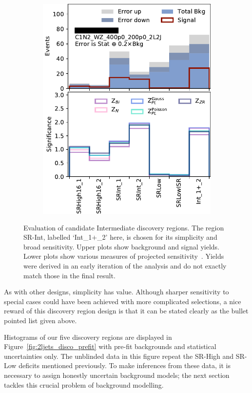 \begin{figure}[tp]
\begin{subfigure}{0.48\textwidth}
\includegraphics[width=\textwidth]{figures/2ljets_disco_Int_C1N2_WZ_400p0_200p0_2L2J.png}
\caption{}
\end{subfigure}
\caption[
Evaluation of candidate Intermediate discovery regions
]{%
Evaluation of candidate Intermediate discovery regions.
The region SR-Int, labelled `Int\_1$+$\_2' here, is chosen for its simplicity
and broad sensitivity.
Upper plots show background and signal yields.
Lower plots show various measures of projected
sensitivity~\cite{cousins2008evaluation}.
Yields were derived in an early iteration of the analysis and do not exactly
match those in the final result.
}
\label{fig:2ljets_disco_trials_int}
\end{figure}

As with other designs, simplicity has value.
Although sharper sensitivity to special cases could have been achieved
with more complicated selections, a nice reward of this discovery region design
is that it can be stated clearly as the bullet pointed list given above.

Histograms of our five discovery regions are displayed in
Figure~\ref{fig:2ljets_disco_prefit}
with pre-fit backgrounds and statistical uncertainties only.
The unblinded data in this figure repeat the SR-High and SR-Low deficits
mentioned previously.
To make inferences from these data, it is necessary to assign honestly
uncertain background models; the next section tackles this crucial problem of
background modelling.

